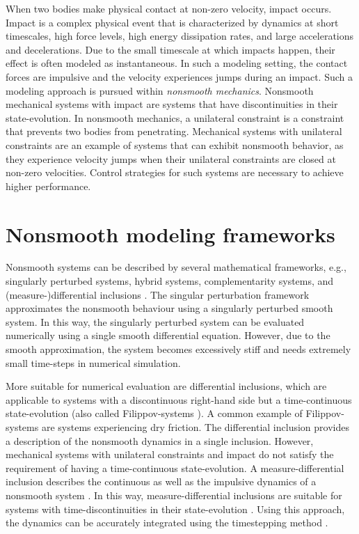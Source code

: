 \documentclass[../DC2019003Bouma.tex]{subfiles}
\begin{document}
When two bodies make physical contact at non-zero velocity, impact occurs. Impact is a complex physical event that is characterized by dynamics at short timescales, high force levels, high energy dissipation rates, and large accelerations and decelerations. Due to the small timescale at which impacts happen, their effect is often modeled as instantaneous. In such a modeling setting, the contact forces are impulsive and the velocity experiences jumps during an impact. Such a modeling approach is pursued within \textit{nonsmooth mechanics}. Nonsmooth mechanical systems with impact are systems that have discontinuities in their state-evolution. In nonsmooth mechanics, a unilateral constraint is a constraint that prevents two bodies from penetrating. Mechanical systems with unilateral constraints are an example of systems that can exhibit nonsmooth behavior, as they experience velocity jumps when their unilateral constraints are closed at non-zero velocities. Control strategies for such systems are necessary to achieve higher performance.

\section{Nonsmooth modeling frameworks}
Nonsmooth systems can be described by several mathematical frameworks, e.g., singularly perturbed systems, hybrid systems, complementarity systems, and (measure-)differential inclusions \cite{Leine2004}. The singular perturbation framework approximates the nonsmooth behaviour using a singularly perturbed smooth system. In this way, the singularly perturbed system can be evaluated numerically using a single smooth differential equation. However, due to the smooth approximation, the system becomes excessively stiff and needs extremely small time-steps in numerical simulation. 

More suitable for numerical evaluation are differential inclusions, which are applicable to systems with a discontinuous right-hand side but a time-continuous state-evolution (also called Filippov-systems \cite{Filippov1988}). A common example of Filippov-systems are systems experiencing dry friction. The differential inclusion provides a description of the nonsmooth dynamics in a single inclusion. However, mechanical systems with unilateral constraints and impact do not satisfy the requirement of having a time-continuous state-evolution. A measure-differential inclusion describes the continuous as well as the impulsive dynamics of a nonsmooth system \cite{Leine2008b}. In this way, measure-differential inclusions are suitable for systems with time-discontinuities in their state-evolution \cite{Moreau1988,Brogliato1999}. Using this approach, the dynamics can be accurately integrated using the timestepping method \cite{Wouwa}. 
\end{document}
